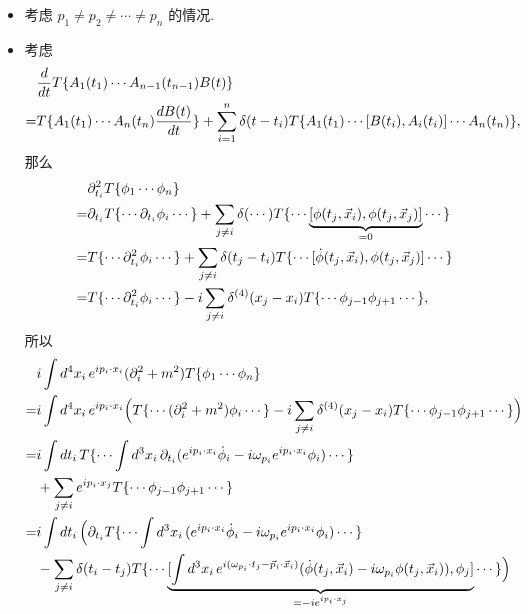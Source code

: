 \begin{itemize}
	\item 考虑 $p_1 \neq p_2 \neq \cdots \neq p_n$ 的情况.
	
	\item 考虑
	\begin{align}
		& \frac{d}{dt} T\{A_1(t_1) \cdots A_{n - 1}(t_{n - 1}) B(t)\} \notag \\
		=& T\{A_1(t_1) \cdots A_n(t_n) \frac{dB(t)}{dt}\} + \sum_{i = 1}^n \delta(t - t_i) T\{A_1(t_1) \cdots [B(t_i), A_i(t_i)] \cdots A_n(t_n)\},
	\end{align}
	那么
	\begin{align}
		& \partial_{t_i}^2 T\{\phi_1 \cdots \phi_n\} \notag \\
		=& \partial_{t_i} T\{\cdots \partial_{t_i} \phi_i \cdots\} + \sum_{j \neq i} \delta(\cdots) T\{\cdots \underbrace{[\phi(t_j, \vec{x}_i), \phi(t_j, \vec{x}_j)]}_{= 0} \cdots\} \notag \\
		=& T\{\cdots \partial_{t_i}^2 \phi_i \cdots\} + \sum_{j \neq i} \delta(t_j - t_i) T\{\cdots [\dot{\phi}(t_j, \vec{x}_i), \phi(t_j, \vec{x}_j)] \cdots\} \notag \\
		=& T\{\cdots \partial_{t_i}^2 \phi_i \cdots\} - i \sum_{j \neq i} \delta^{(4)}(x_j - x_i) T\{\cdots \phi_{j - 1} \phi_{j + 1} \cdots\},
	\end{align}
	所以
	\begin{align}
		& i \int d^4 x_i \, e^{i p_i \cdot x_i} (\partial_i^2 + m^2) T\{\phi_1 \cdots \phi_n\} \notag \\
		=& i \int d^4 x_i \, e^{i p_i \cdot x_i} \Big( T\{\cdots (\partial_i^2 + m^2) \phi_i \cdots\} - i \sum_{j \neq i} \delta^{(4)}(x_j - x_i) T\{\cdots \phi_{j - 1} \phi_{j + 1} \cdots\} \Big) \notag \\
		=& i \int dt_i \, T\{\cdots \int d^3 x_i \, \partial_{t_i}(e^{i p_i \cdot x_i} \dot{\phi}_i - i \omega_{p_i} e^{i p_i \cdot x_i} \phi_i) \cdots\} \notag \\
		& + \sum_{j \neq i} e^{i p_i \cdot x_j} T\{\cdots \phi_{j - 1} \phi_{j + 1} \cdots\} \notag \\
		=& i \int dt_i \, \Big( \partial_{t_i} T\{\cdots \int d^3 x_i \, (e^{i p_i \cdot x_i} \dot{\phi}_i - i \omega_{p_i} e^{i p_i \cdot x_i} \phi_i) \cdots\} \notag \\
		& - \sum_{j \neq i} \delta(t_i - t_j) T\{\cdots \underbrace{[\int d^3 x_i \, e^{i (\omega_{p_i} \cdot t_j - \vec{p}_i \cdot \vec{x}_i)} (\dot{\phi}(t_j, \vec{x}_i) - i \omega_{p_i} \phi(t_j, \vec{x}_i)), \phi_j]}_{= - i e^{i p_i \cdot x_j}} \cdots\} \Big) \notag \\

\end{align}
\end{itemize}
